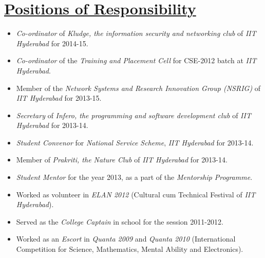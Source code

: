 \documentclass[9pt]{extarticle}
\newcommand{\heading}[1]{
\section*{\color{red}\underline{#1}}
}
\begin{document}
\heading{Positions of Responsibility}
\begin{itemize}
\item \textit{Co-ordinator} of \textit{Kludge, the information security and networking club} of \textit{IIT Hyderabad} for 2014-15.
\item \textit{Co-ordinator} of the \textit{Training and Placement Cell} for CSE-2012 batch at \textit{IIT Hyderabad}.
\item Member of the \textit{Network Systems and Research Innovation Group (NSRIG)} of \textit{IIT Hyderabad} for 2013-15.
\item \textit{Secretary} of \textit{Infero, the programming and software development club} of \textit{IIT Hyderabad} for 2013-14.
\item \textit{Student Convenor} for \textit{National Service Scheme}, \textit{IIT Hyderabad} for 2013-14.
\item Member of \textit{Prakriti, the Nature Club} of \textit{IIT Hyderabad} for 2013-14.
\item \textit{Student Mentor} for the year 2013, as a part of the \textit{Mentorship Programme}.
\item Worked as volunteer in \textit{ELAN 2012} (Cultural cum Technical Festival of \textit{IIT Hyderabad}).
\item Served as the \textit{College Captain} in school for the session 2011-2012.
\item Worked as an \textit{Escort} in \textit{Quanta 2009} and \textit{Quanta 2010} (International Competition for Science, Mathematics, Mental Ability and Electronics).
\end{itemize}
\end{document}
